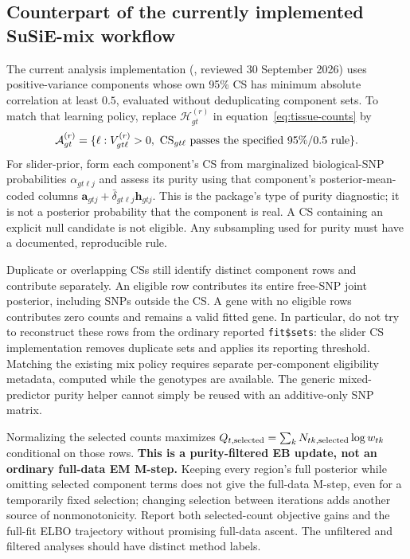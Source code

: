 \documentclass[11pt]{article}
\begin{document}
\subsection{Counterpart of the currently implemented SuSiE-mix workflow}
The current analysis implementation
(, reviewed 30 September 2026)
uses positive-variance components whose own 95\% CS has minimum absolute
correlation at least $0.5$, evaluated without deduplicating component sets.
To match that learning policy, replace $\mathcal H_{gt}^{(r)}$ in
equation~\eqref{eq:tissue-counts} by
\begin{equation}
 \mathcal A_{gt}^{(r)}
 =\{\ell:V_{gt\ell}^{(r)}>0,\ 
       {\rm CS}_{gt\ell}\text{ passes the specified 95\%/0.5 rule}\}.
 \label{eq:tissue-selected}
\end{equation}
For slider-prior, form each component's CS from marginalized biological-SNP
probabilities $\alpha_{gt\ell j}$ and assess its purity using that component's
posterior-mean-coded columns
$\mathbf a_{gtj}+\bar\delta_{gt\ell j}\mathbf h_{gtj}$.
This is the package's type of purity diagnostic; it is not a posterior
probability that the component is real. A CS containing an explicit null
candidate is not eligible. Any subsampling used for purity must have a
documented, reproducible rule.

Duplicate or overlapping CSs still identify distinct component rows and
contribute separately. An eligible row contributes its entire free-SNP
joint posterior, including SNPs outside the CS. A gene with no eligible
rows contributes zero counts and remains a valid fitted gene.
In particular, do not try to reconstruct these rows from the ordinary
reported \texttt{fit\$sets}: the slider CS implementation removes duplicate
sets and applies its reporting threshold. Matching the existing mix policy
requires separate per-component eligibility metadata, computed while the
genotypes are available. The generic mixed-predictor purity helper cannot
simply be reused with an additive-only SNP matrix.

Normalizing the selected counts maximizes
$Q_{t,\rm selected}=\sum_kN_{tk,\rm selected}\log w_{tk}$ conditional on
those rows. \textbf{This is a purity-filtered EB update, not an ordinary
full-data EM M-step.} Keeping every region's full posterior while omitting
selected component terms does not give the full-data M-step, even for a
temporarily fixed selection; changing selection between iterations adds
another source of nonmonotonicity. Report both selected-count objective
gains and the full-fit ELBO trajectory without promising full-data ascent.
The unfiltered and filtered analyses should have distinct method labels.
\end{document}
